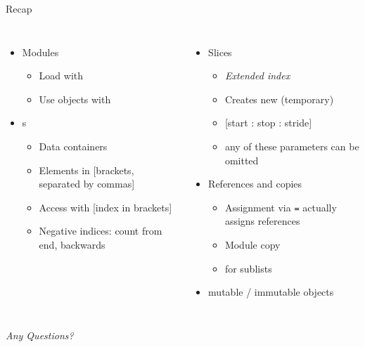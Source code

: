 
\begin{frame}[t,plain]
\titlepage
\end{frame}


\begin{frame}{Recap}
%
\begin{columns}[T]
\begin{itemize}
\item Modules
	\begin{itemize}
	\item Load with 
	\item Use objects with 
	\end{itemize}
\item {}s
	\begin{itemize}
	\item Data containers
	\item Elements in [brackets, separated by commas]
	\item Access with [index in brackets]
	\item Negative indices: count from end, backwards
	\end{itemize}
\end{itemize}
%
\begin{itemize}
\item Slices
	\begin{itemize}
	\item \emph{Extended index}
	\item Creates new (temporary) 
	\item \hspace{0pt} [start : stop : stride]
	\item any of these parameters can be omitted
	\end{itemize}
\item References and copies
	\begin{itemize}
	\item Assignment via \texttt{=} actually assigns references
	\item Module copy
	\item {} for sublists
	\end{itemize}
\item mutable / immutable objects
\end{itemize}

\end{columns}
%
\begin{center}
	\emph{Any Questions?}
\end{center}
%
\end{frame}

